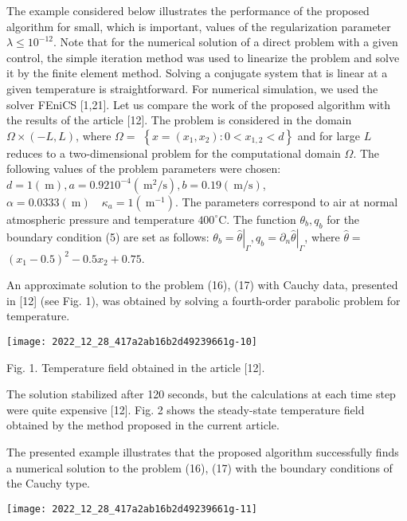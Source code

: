 The example considered below illustrates the performance of the proposed algorithm for small, which is important, values of the regularization parameter $\lambda \leq 10^{-12}$. Note that for the numerical solution of a direct problem with a given control, the simple iteration method was used to linearize the problem and solve it by the finite element method. Solving a conjugate system that is linear at a given temperature is straightforward. For numerical simulation, we used the solver FEniCS [1,21]. Let us compare the work of the proposed algorithm with the results of the article [12]. The problem is considered in the domain $\Omega \times(-L, L)$, where $\Omega=$ $\left\{x=\left(x_{1}, x_{2}\right): 0<x_{1,2}<d\right\}$ and for large $L$ reduces to a two-dimensional problem for the computational domain $\Omega$. The following values of the problem parameters were chosen: $d=1(\mathrm{~m}), a=0.9210^{-4}\left(\mathrm{~m}^{2} / \mathrm{s}\right), b=0.19(\mathrm{~m} / \mathrm{s})$, $\alpha=0.0333(\mathrm{~m}) \quad \kappa_{a}=1\left(\mathrm{~m}^{-1}\right)$. The parameters correspond to air at normal atmospheric pressure and temperature $400^{\circ} \mathrm{C}$. The function $\theta_{b}, q_{b}$ for the boundary condition (5) are set as follows: $\theta_{b}=\left.\widehat{\theta}\right|_{\Gamma}, q_{b}=\left.\partial_{n} \widehat{\theta}\right|_{\Gamma}$, where $\widehat{\theta}=$ $\left(x_{1}-0.5\right)^{2}-0.5 x_{2}+0.75$.

An approximate solution to the problem (16), (17) with Cauchy data, presented in [12] (see Fig. 1), was obtained by solving a fourth-order parabolic problem for temperature.

\begin{center}
\texttt{[image: 2022\_12\_28\_417a2ab16b2d49239661g-10]}
\end{center}

Fig. 1. Temperature field obtained in the article [12].

The solution stabilized after 120 seconds, but the calculations at each time step were quite expensive [12]. Fig. 2 shows the steady-state temperature field obtained by the method proposed in the current article.

The presented example illustrates that the proposed algorithm successfully finds a numerical solution to the problem (16), (17) with the boundary conditions of the Cauchy type.

\begin{center}
\texttt{[image: 2022\_12\_28\_417a2ab16b2d49239661g-11]}
\end{center}
